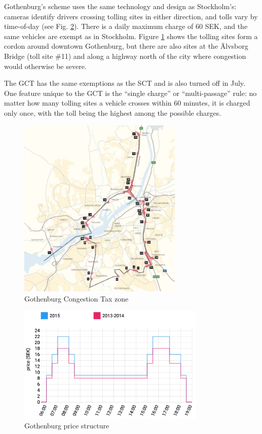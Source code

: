 Gothenburg's scheme uses the same technology and design as Stockholm's: cameras identify drivers crossing tolling sites in either direction, and tolls vary by time-of-day (see Fig. \ref{fig:gothenburg-prices}). There is a daily maximum charge of 60 SEK, and the same vehicles are exempt as in Stockholm. Figure \ref{fig:Gothenburg-map} shows the tolling sites form a cordon around downtown Gothenburg, but there are also sites at the \"Alvsborg Bridge (toll site \#11) and along a highway north of the city where congestion would otherwise be severe.

The GCT has the same exemptions as the SCT and is also turned off in July. One feature unique to the GCT is the ``single charge'' or  ``multi-passage'' rule: no matter how many tolling sites a vehicle crosses within 60 minutes, it is charged only once, with the toll being the highest among the possible charges. 

\begin{figure}[ht]
\includegraphics[width=0.7\textwidth]{../img/gburg-map.png}
\caption{Gothenburg Congestion Tax zone \citep{transportstyrelsen2015}\label{fig:Gothenburg-map}}
\end{figure}

\begin{figure}
    \includegraphics[width=0.8\textwidth]{../img/gothenburg-prices.png}
    \caption{Gothenburg price structure } 
    \label{fig:gothenburg-prices}
\end{figure}

